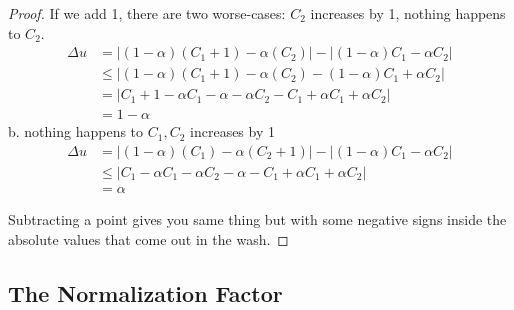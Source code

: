 \documentclass[11pt]{scrartcl} %
\begin{document}
\begin{proof}
If we add 1, there are two worse-cases: $C_2$ increases by 1, nothing happens to $C_2$.
\begin{align*}
\Delta u &= \left\vert (1-\alpha) (C_1 + 1) - \alpha (C_2) \right\vert - \left\vert (1-\alpha) C_1 - \alpha C_2 \right\vert \\
 &\le \left\vert (1-\alpha) (C_1 + 1) - \alpha (C_2) - (1-\alpha) C_1 + \alpha C_2 \right\vert \\
&= \left\vert C_1 + 1 - \alpha C_1 - \alpha - \alpha C_2 - C_1 + \alpha C_1 + \alpha C_2 \right\vert \\
&= 1 - \alpha
\end{align*}
b. nothing happens to $C_1, C_2$ increases by 1
\begin{align*}
\Delta u &= \left\vert (1-\alpha) (C_1) - \alpha (C_2 + 1) \right\vert - \left\vert (1-\alpha) C_1 - \alpha C_2 \right\vert \\
&\le \left\vert C_1 -\alpha C_1 - \alpha C_2 - \alpha - C_1 + \alpha C_1 + \alpha C_2 \right\vert \\
&= \alpha 
\end{align*}

Subtracting a point gives you same thing but with some negative signs inside the absolute values that come out in the wash.
\end{proof}

\subsection{The Normalization Factor}


\nocite{*}

\end{document}
